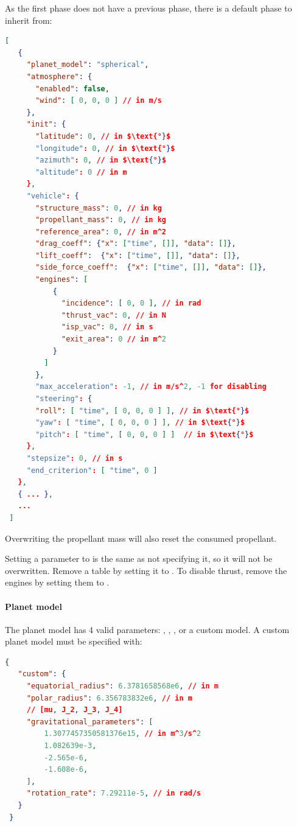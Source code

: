 As the first phase does not have a previous phase, there is a default phase to
inherit from:

\begin{lstlisting}[language=json,mathescape]
 [
   {
     "planet_model": "spherical",
     "atmosphere": {
       "enabled": false,
       "wind": [ 0, 0, 0 ] // in m/s
     },
     "init": {
       "latitude": 0, // in $\text{°}$
       "longitude": 0, // in $\text{°}$
       "azimuth": 0, // in $\text{°}$
       "altitude": 0 // in m
     },
     "vehicle": {
       "structure_mass": 0, // in kg
       "propellant_mass": 0, // in kg
       "reference_area": 0, // in m^2
       "drag_coeff": {"x": ["time", []], "data": []},
       "lift_coeff":  {"x": ["time", []], "data": []},
       "side_force_coeff":  {"x": ["time", []], "data": []},
       "engines": [
           {
             "incidence": [ 0, 0 ], // in rad
             "thrust_vac": 0, // in N
             "isp_vac": 0, // in s
             "exit_area": 0 // in m^2
           }
         ]
       },
       "max_acceleration": -1, // in m/s^2, -1 for disabling
       "steering": {
       "roll": [ "time", [ 0, 0, 0 ] ], // in $\text{°}$
       "yaw": [ "time", [ 0, 0, 0 ] ], // in $\text{°}$
       "pitch": [ "time", [ 0, 0, 0 ] ]  // in $\text{°}$
     },
     "stepsize": 0, // in s
     "end_criterion": [ "time", 0 ]
   },
   { ... },
   ...
 ]
\end{lstlisting}

Overwriting the propellant mass will also reset the consumed propellant.

Setting a parameter to  is the same as not specifying it, so it will not be overwritten.
Remove a table by setting it to . To disable thrust, remove
the engines by setting them to \json{[]}.

\paragraph{Planet model}

The planet model has 4 valid parameters:
, , , or a custom model. A custom planet model must be
specified with:

\begin{lstlisting}[language=json]
 {
   "custom": {
     "equatorial_radius": 6.3781658568e6, // in m
     "polar_radius": 6.356783832e6, // in m
     // [mu, J_2, J_3, J_4]
     "gravitational_parameters": [
         1.3077457350581376e15, // in m^3/s^2
         1.082639e-3,
         -2.565e-6,
         -1.608e-6,
     ],
     "rotation_rate": 7.29211e-5, // in rad/s
   }
 }
\end{lstlisting}

